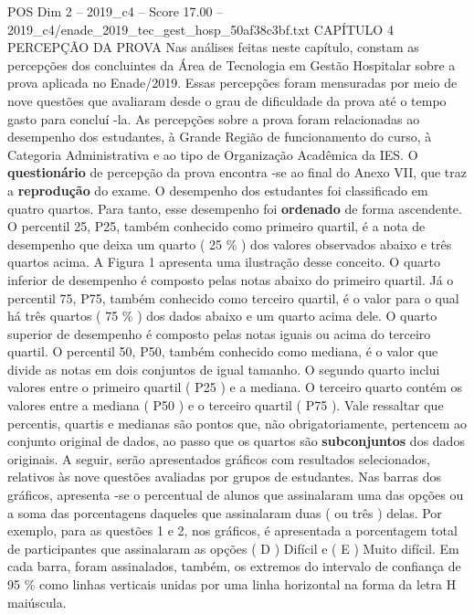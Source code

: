 \begin{textsample}{POS Dim 2 – 2019\_c4 – Score 17.00 – 2019\_c4/enade\_2019\_tec\_gest\_hosp\_50af38c3bf.txt}  \label{ex:f2_pos_048}
CAPÍTULO 4 PERCEPÇÃO DA PROVA Nas análises feitas neste capítulo, constam as percepções dos concluintes da Área de Tecnologia em Gestão Hospitalar sobre a prova aplicada no Enade/2019.
Essas percepções foram mensuradas por meio de nove questões que avaliaram desde o grau de dificuldade da prova até o tempo gasto para concluí -la.
As percepções sobre a prova foram relacionadas ao desempenho dos estudantes, à Grande Região de funcionamento do curso, à Categoria Administrativa e ao tipo de Organização Acadêmica da IES.
O \textbf{questionário} de percepção da prova encontra -se ao final do Anexo VII, que traz a \textbf{reprodução} do exame.
O desempenho dos estudantes foi classificado em quatro quartos.
Para tanto, esse desempenho foi \textbf{ordenado} de forma ascendente.
O percentil 25, P25, também conhecido como primeiro quartil, é a nota de desempenho que deixa um quarto ( 25 \% ) dos valores observados abaixo e três quartos acima.
A Figura 1 apresenta uma ilustração desse conceito.
O quarto inferior de desempenho é composto pelas notas abaixo do primeiro quartil.
Já o percentil 75, P75, também conhecido como terceiro quartil, é o valor para o qual há três quartos ( 75 \% ) dos dados abaixo e um quarto acima dele.
O quarto superior de desempenho é composto pelas notas iguais ou acima do terceiro quartil.
O percentil 50, P50, também conhecido como mediana, é o valor que divide as notas em dois conjuntos de igual tamanho.
O segundo quarto inclui valores entre o primeiro quartil ( P25 ) e a mediana.
O terceiro quarto contém os valores entre a mediana ( P50 ) e o terceiro quartil ( P75 ).
Vale ressaltar que percentis, quartis e medianas são pontos que, não obrigatoriamente, pertencem ao conjunto original de dados, ao passo que os quartos são \textbf{subconjuntos} dos dados originais.
A seguir, serão apresentados gráficos com resultados selecionados, relativos às nove questões avaliadas por grupos de estudantes.
Nas barras dos gráficos, apresenta -se o percentual de alunos que assinalaram uma das opções ou a soma das porcentagens daqueles que assinalaram duas ( ou três ) delas.
Por exemplo, para as questões 1 e 2, nos gráficos, é apresentada a porcentagem total de participantes que assinalaram as opções ( D ) Difícil e ( E ) Muito difícil.
Em cada barra, foram assinalados, também, os extremos do intervalo de confiança de 95 \% como linhas verticais unidas por uma linha horizontal na forma da letra H maiúscula.

\end{textsample}
